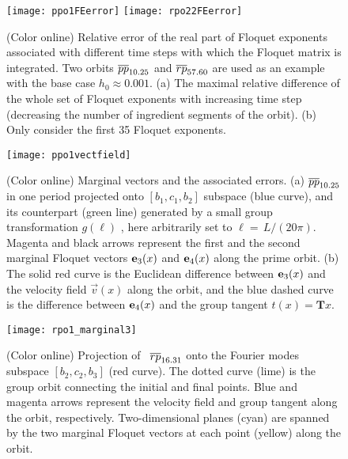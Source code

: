 \documentclass[final,leqno,onefignum,onetabnum]{siamltexmm}
\begin{document}
\begin{figure}[h]
  \centering
  \texttt{[image: ppo1FEerror]} \hfill
  \texttt{[image: rpo22FEerror]}
  \caption{(Color online) Relative error of the real part of
    Floquet exponents associated with different time steps
    with which the Floquet matrix is integrated. Two orbits $\cycle{pp}_{10.25}$
    and $\cycle{rp}_{57.60}$ are used as an example with the base
    case $h_0 \approx 0.001$. (a) The maximal relative difference of
    the whole set of Floquet exponents with increasing time step (decreasing
    the number of ingredient segments of the orbit). (b) Only consider
    the first 35 Floquet exponents.}
  \label{fig:FEerror}
\end{figure}
\begin{figure}[h]
  \centering
  \texttt{[image: ppo1vectfield]}
  \caption{(Color online)
    Marginal vectors and the associated errors.
    (a) $\cycle{pp}_{10.25}$ in one period projected onto
    {$[b_1, c_{1}, b_{2}]$}
    subspace (blue curve), and its counterpart (green line) generated by
    a small group transformation $g(\ell)$
    , here arbitrarily set to $\ell= \,L/(20\pi)$. Magenta and black
    arrows represent the first and the second marginal Floquet vectors
    $\jEigvec[3](x)$ and $\jEigvec[4](x)$ along the prime orbit.
    (b) The solid red curve is the {Euclidean} difference between
    $\jEigvec[3](x)$ and the velocity field $\vec{v}(x)$ along the orbit,
    and the blue dashed curve is the difference between $\jEigvec[4](x)$ and
    the group tangent $t(x)=\mathbf{T}x$.
  }
  \label{fig:ppo1vectorfield}
\end{figure}
\begin{figure}[h]
  \centering
  \texttt{[image: rpo1\_marginal3]}
  \caption{
    (Color online) Projection of \rpo\ $\cycle{rp}_{16.31}$ onto
    the Fourier modes
    subspace $[b_2,c_2,b_3]$ (red curve). The dotted
     curve (lime) is the group orbit
    connecting the initial and final points. Blue and magenta arrows
    represent the velocity field and group tangent along the orbit,
    respectively. Two-dimensional planes (cyan) are spanned by the
    two marginal Floquet vectors at each point (yellow) along the orbit.
  }
  \label{fig:rpo1_marginal3}
\end{figure}
\end{document}
